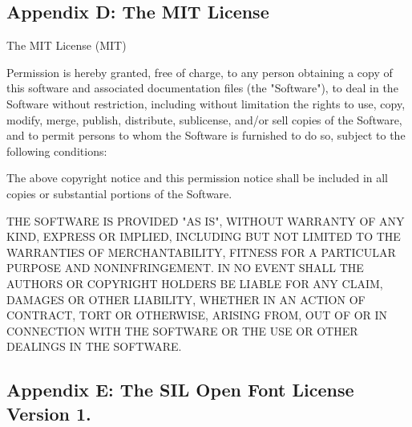 \begin{DoxyCode}
\end{DoxyCode}


\subsection*{Appendix D\+: The M\+IT License }


\begin{DoxyCode}
The MIT License (MIT)

Permission is hereby granted, free of charge, to any person obtaining a copy
of this software and associated documentation files (the "Software"), to deal
in the Software without restriction, including without limitation the rights
to use, copy, modify, merge, publish, distribute, sublicense, and/or sell
copies of the Software, and to permit persons to whom the Software is
furnished to do so, subject to the following conditions:

The above copyright notice and this permission notice shall be included in
all copies or substantial portions of the Software.

THE SOFTWARE IS PROVIDED "AS IS", WITHOUT WARRANTY OF ANY KIND, EXPRESS OR
IMPLIED, INCLUDING BUT NOT LIMITED TO THE WARRANTIES OF MERCHANTABILITY,
FITNESS FOR A PARTICULAR PURPOSE AND NONINFRINGEMENT. IN NO EVENT SHALL THE
AUTHORS OR COPYRIGHT HOLDERS BE LIABLE FOR ANY CLAIM, DAMAGES OR OTHER
LIABILITY, WHETHER IN AN ACTION OF CONTRACT, TORT OR OTHERWISE, ARISING FROM,
OUT OF OR IN CONNECTION WITH THE SOFTWARE OR THE USE OR OTHER DEALINGS IN
THE SOFTWARE.
\end{DoxyCode}


\subsection*{Appendix E\+: The S\+IL Open Font License Version 1. }


